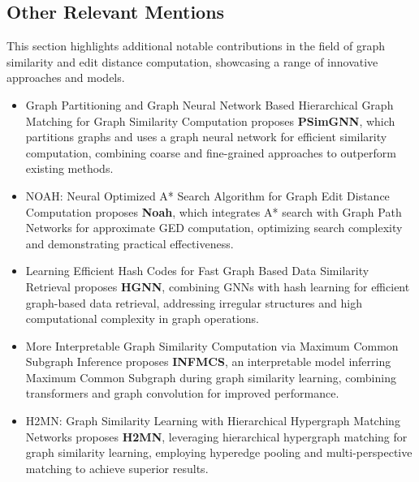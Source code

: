 \documentclass[../Thesis.tex]{subfiles}
\begin{document}
	\subsection{Other Relevant Mentions}
	
	This section highlights additional notable contributions in the field of graph similarity and edit distance computation, showcasing a range of innovative approaches and models.
	
	\begin{itemize}
		
		\item Graph Partitioning and Graph Neural Network Based Hierarchical Graph Matching for Graph Similarity Computation \cite{graph_partitioning_and_graph_neural_network_based_hierarchical_graph_matching_for_graph_similarity_computation} proposes \textbf{PSimGNN}, which partitions graphs and uses a graph neural network for efficient similarity computation, combining coarse and fine-grained approaches to outperform existing methods.
		
		\item NOAH: Neural Optimized A* Search Algorithm for Graph Edit Distance Computation \cite{noah__neural_optimized_a*_search_algorithm_for_graph_edit_distance_computation} proposes \textbf{Noah}, which integrates A* search with Graph Path Networks for approximate GED computation, optimizing search complexity and demonstrating practical effectiveness.
		
		\item Learning Efficient Hash Codes for Fast Graph Based Data Similarity Retrieval \cite{learning_efficient_hash_codes_for_fast_graph_based_data_similarity_retrieval} proposes \textbf{HGNN}, combining GNNs with hash learning for efficient graph-based data retrieval, addressing irregular structures and high computational complexity in graph operations.
		
		\item More Interpretable Graph Similarity Computation via Maximum Common Subgraph Inference \cite{more_interpretable_graph_similarity_computation_via_maximum_common_subgraph_inference} proposes \textbf{INFMCS}, an interpretable model inferring Maximum Common Subgraph during graph similarity learning, combining transformers and graph convolution for improved performance.
		
		\item H2MN: Graph Similarity Learning with Hierarchical Hypergraph Matching Networks \cite{h2mn__graph_similarity_learning_with_hierarchical_hypergraph_matching_networks} proposes \textbf{H2MN}, leveraging hierarchical hypergraph matching for graph similarity learning, employing hyperedge pooling and multi-perspective matching to achieve superior results.
		

\end{itemize}
\end{document}
